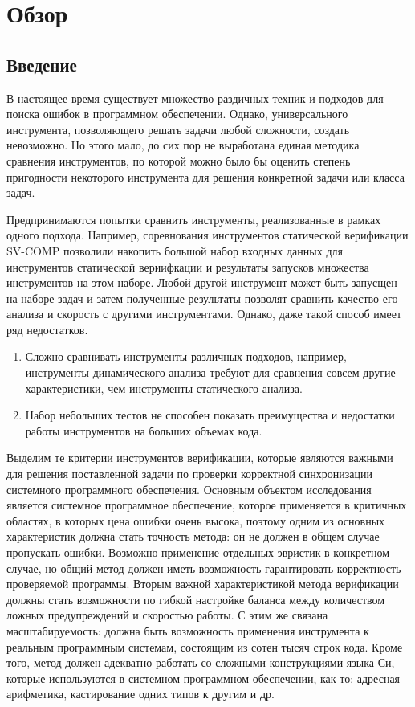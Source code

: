 \chapter{Обзор}
\label{chapter_related_work}

\section{Введение}
\label{rw:introduction}


В настоящее время существует множество раздичных техник и подходов для поиска ошибок в программном обеспечении.
Однако, универсального инструмента, позволяющего решать задачи любой сложности, создать невозможно.
Но этого мало, до сих пор не выработана единая методика сравнения инструментов, по которой можно было бы оценить степень пригодности некоторого инструмента для решения конкретной задачи или класса задач.

Предпринимаются попытки сравнить инструменты, реализованные в рамках одного подхода.
Например, соревнования инструментов статической верификации SV-COMP позволили накопить большой набор входных данных для инструментов статической вериифкации и результаты запусков множества инструментов на этом наборе.
Любой другой инструмент может быть запусщен на наборе задач и затем полученные результаты позволят сравнить качество его анализа и скорость с другими инструментами.
Однако, даже такой способ имеет ряд недостатков. 
\begin{enumerate}
\item Сложно сравнивать инструменты различных подходов, например, инструменты динамического анализа требуют для сравнения совсем другие характеристики, чем инструменты статического анализа.
\item Набор небольших тестов не способен показать преимущества и недостатки работы инструментов на больших объемах кода.
\end{enumerate}

Выделим те критерии инструментов верификации, которые являются важными для решения поставленной задачи по проверки корректной синхронизации системного программного обеспечения.
Основным объектом исследования является системное программное обеспечение, которое применяется в критичных областях, в которых цена ошибки очень высока, поэтому одним из основных характеристик должна стать точность метода: он не должен в общем случае пропускать ошибки.
Возможно применение отдельных эвристик в конкретном случае, но общий метод должен иметь возможность гарантировать корректность проверяемой программы.
Вторым важной характеристикой метода верификации должны стать возможности по гибкой настройке баланса между количеством ложных предупреждений и скоростью работы.
С этим же связана масштабируемость: должна быть возможность применения инструмента к реальным программным системам, состоящим из сотен тысяч строк кода.
Кроме того, метод должен адекватно работать со сложными конструкциями языка Си, которые используются в системном программном обеспечении, как то: адресная арифметика, кастирование одних типов к другим и др.

